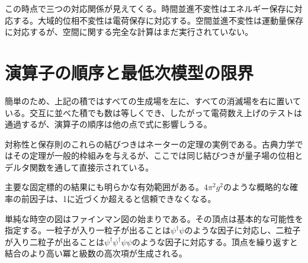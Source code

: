 この時点で三つの対応関係が見えてくる。時間並進不変性はエネルギー保存に対応する。大域的位相不変性は電荷保存に対応する。空間並進不変性は運動量保存に対応するが、空間に関する完全な計算はまだ実行されていない。

\section{演算子の順序と最低次模型の限界}

簡単のため、上記の積ではすべての生成場を左に、すべての消滅場を右に置いている。交互に並べた積でも数は等しくでき、したがって電荷数え上げのテストは通過するが、演算子の順序は他の点で式に影響しうる。

\begin{classroomqa}
\end{classroomqa}


対称性と保存則のこれらの結びつきはネーターの定理の実例である。古典力学ではその定理が一般的枠組みを与えるが、ここでは同じ結びつきが量子場の位相とデルタ関数を通して直接示されている。

主要な固定標的の結果にも明らかな有効範囲がある。\(4\pi^2g^2\)のような概略的な確率の前因子は、1に近づくか超えると信頼できなくなる。

\begin{classroomqa}
\end{classroomqa}

単純な時空の図はファインマン図の始まりである。その頂点は基本的な可能性を指定する。一粒子が入り一粒子が出ることは\(\psi^\dagger\psi\)のような因子に対応し、二粒子が入り二粒子が出ることは\(\psi^\dagger\psi^\dagger\psi\psi\)のような因子に対応する。頂点を繰り返すと結合のより高い冪と級数の高次項が生成される。

